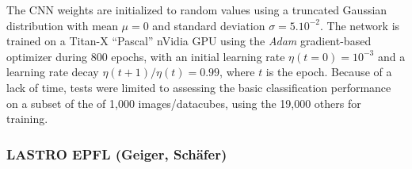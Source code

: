 \documentclass{aa}
\begin{document}
The CNN weights are initialized to random values using a truncated Gaussian distribution with mean $\mu=0$ and standard deviation $\sigma=5.10^{-2}$. The network is trained on a Titan-X ``Pascal'' nVidia GPU using the \textit{Adam} gradient-based optimizer during 800 epochs, with an initial learning rate $\eta(t=0)=10^{-3}$ and a learning rate decay $\eta(t+1)/\eta(t)=0.99$, where $t$ is the epoch. Because of a lack of time, tests were limited to assessing the basic classification performance on a subset of the of 1,000 images/datacubes, using the 19,000 others for training.


\subsubsection{LASTRO EPFL (Geiger, Sch\"{a}fer)}
\end{document}
